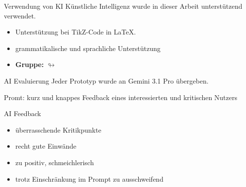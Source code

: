   \begin{frame}{Verwendung von KI}
    Künstliche Intelligenz wurde in dieser Arbeit unterstützend verwendet. 
  
    \vspace{0.4cm}
    \begin{itemize}
        \item Unterstützung bei TikZ-Code in \LaTeX.
        \item grammatikalische und sprachliche Unterstützung
        \item \textbf{Gruppe:} $\looparrowright $
    \end{itemize}
\end{frame}
%
\begin{frame}{AI Evaluierung}
  Jeder Prototyp wurde an \alert{Gemini 3.1 Pro} übergeben.

  \vspace{0.4cm}
  \alert{Promt:} kurz und knappes Feedback eines interessierten und kritischen Nutzers
\end{frame}
%
\begin{frame}{AI Feedback}
  \begin{itemize}
    \item überrasschende Kritikpunkte
    \item recht gute Einwände
    \item zu positiv, schmeichlerisch
    \item trotz Einschränkung im Prompt zu ausschweifend
  \end{itemize}
\end{frame}